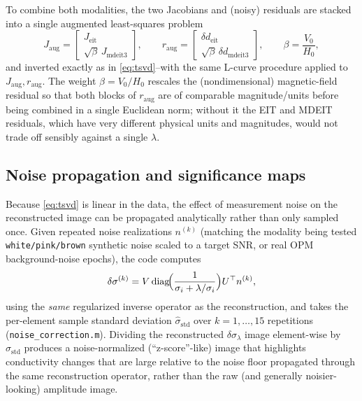 \documentclass[11pt]{article}
\begin{document}
To combine both modalities, the two Jacobians and (noisy) residuals are stacked into a single augmented least-squares problem
\begin{equation}
J_\text{aug} = \begin{bmatrix}J_\text{eit}\\ \sqrt{\beta}\,J_\text{mdeit3}\end{bmatrix}, \qquad
r_\text{aug} = \begin{bmatrix}\delta d_\text{eit}\\ \sqrt{\beta}\,\delta d_\text{mdeit3}\end{bmatrix}, \qquad \beta = \frac{V_0}{H_0},
\end{equation}
and inverted exactly as in \eqref{eq:tsvd}--with the same L-curve procedure applied to $J_\text{aug}, r_\text{aug}$. The weight $\beta=V_0/H_0$ rescales the (nondimensional) magnetic-field residual so that both blocks of $r_\text{aug}$ are of comparable magnitude/units before being combined in a single Euclidean norm; without it the EIT and MDEIT residuals, which have very different physical units and magnitudes, would not trade off sensibly against a single $\lambda$.

\subsection{Noise propagation and significance maps}

Because \eqref{eq:tsvd} is linear in the data, the effect of measurement noise on the reconstructed image can be propagated analytically rather than only sampled once. Given repeated noise realizations $n^{(k)}$ (matching the modality being tested \textemdash{} \texttt{white/pink/brown} synthetic noise scaled to a target SNR, or real OPM background-noise epochs), the code computes
\begin{equation}
\delta\sigma^{(k)} = V\,\mathrm{diag}\!\Bigl(\frac{1}{\sigma_i+\lambda/\sigma_i}\Bigr)U^\top n^{(k)},
\end{equation}
using the \emph{same} regularized inverse operator as the reconstruction, and takes the per-element sample standard deviation $\hat\sigma_\text{std}$ over $k=1,\dots,15$ repetitions (\texttt{noise\_correction.m}). Dividing the reconstructed $\delta\sigma_\lambda$ image element-wise by $\hat\sigma_\text{std}$ produces a noise-normalized (``z-score''-like) image that highlights conductivity changes that are large relative to the noise floor propagated through the same reconstruction operator, rather than the raw (and generally noisier-looking) amplitude image.
\end{document}
